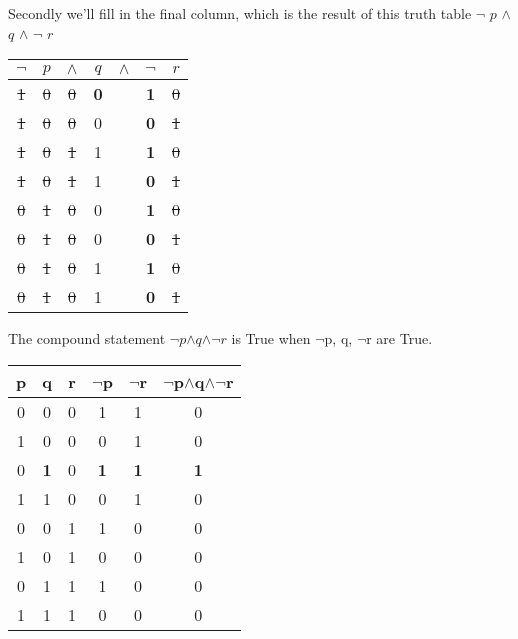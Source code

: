 \documentclass[10pt,a4paper,draft,titlepage,onecolumn]{book}
\begin{document}
Secondly we'll fill in the final column, which is the result of this truth table
{$\neg$} $p$  {$\wedge$}  $q$  {$\wedge$}  {$\neg$}   $r$ \\

\begin{center}
\begin{tabular}{ |c|c|c|c|c|c|c| }
\hline
 {$\neg$} & $p$ & {$\wedge$} & $q$ & {$\wedge$} & {$\neg$}  & $r$ \\
\hline
       \st{1}   & \st{0}   &  \st{0}          & \textbf{0}   &            &       \textbf{1}    &\st{0}\\
       \st{1}   & \st{0}   &  \st{0}          & 0   &            &       \textbf{0}    &\st{1}\\
       \st{1}   & \st{0}   &  \st{1}          & 1   &            &       \textbf{1}    &\st{0}\\
       \st{1}   & \st{0}   &  \st{1}          & 1   &            &       \textbf{0}    &\st{1}\\
       \st{0}   & \st{1}   &  \st{0}          & 0   &            &       \textbf{1}    &\st{0}\\
       \st{0}   & \st{1}   &  \st{0}          & 0   &            &       \textbf{0}    &\st{1}\\
       \st{0}   & \st{1}   &  \st{0}          & 1   &            &       \textbf{1}    &\st{0}\\
       \st{0}   & \st{1}   &  \st{0}          & 1   &            &       \textbf{0}    &\st{1}\\
 \hline
\end{tabular}
\end{center}

The compound statement {$\neg$}$p${$\wedge$}$q${$\wedge$}{$\neg$}$r$ is True when {$\neg$}p, q, {$\neg$}r are True.

\begin{center}
\begin{tabular}{ |c|c|c|c|c|c| }

 \hline
 p & q & r &  {$\neg$}p &{$\neg$}r & {$\neg$}p{$\wedge$}q{$\wedge$}{$\neg$}r \\
 \hline
 0 & 0 & 0 & 1 & 1 & 0\\
 1 & 0 & 0 & 0 & 1 & 0\\
 0 & \textbf{1} & 0 & \textbf{1} & \textbf{1} & \textbf{1}\\
 1 & 1 & 0 & 0 & 1 & 0\\
 0 & 0 & 1 & 1 & 0 & 0\\
 1 & 0 & 1 & 0 & 0 & 0\\
 0 & 1 & 1 & 1 & 0 & 0\\
 1 & 1 & 1 & 0 & 0 & 0\\
 \hline
\end{tabular}
\end{center}
\end{document}
